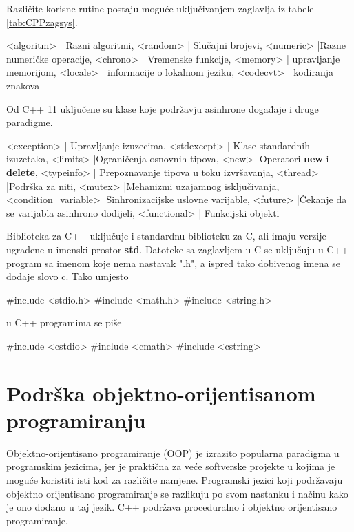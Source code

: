 \documentclass[11pt]{book}
\begin{document}
Različite korisne rutine postaju moguće uključivanjem zaglavlja iz tabele
\ref{tab:CPPzagsys}.

{
  <algoritm> | Razni algoritmi,
  <random> | Slučajni brojevi,
  <numeric> |Razne numeričke operacije,
  <chrono> | Vremenske funkcije,
  <memory> | upravljanje memorijom,
  <locale> | informacije o lokalnom jeziku,
  <codecvt> | kodiranja znakova
}

Od C++ 11 uključene su klase koje podržavju asinhrone događaje i druge paradigme.

{
  <exception> | Upravljanje izuzecima,
  <stdexcept> | Klase standardnih izuzetaka,
  <limits> |Ograničenja osnovnih tipova,
  <new> |Operatori \textbf{new} i \textbf{delete},
  <typeinfo> | Prepoznavanje tipova u toku izvršavanja,
  <thread> |Podrška za niti,
  <mutex> |Mehanizmi uzajamnog isključivanja,
  <condition\_variable> |Sinhronizacijske uslovne varijable,
  <future> |Čekanje da se varijabla asinhrono dodijeli,
  <functional> | Funkcijski objekti
}

Biblioteka za C++ uključuje i standardnu biblioteku za C, ali imaju verzije ugrađene u imenski prostor \textbf{std}. Datoteke sa zaglavljem u C se uključuju u C++ program sa imenom koje nema nastavak ".h", a ispred tako dobivenog imena se dodaje slovo c. Tako umjesto
\begin{shortlisting}
  #include <stdio.h>
  #include <math.h>
  #include <string.h>
\end{shortlisting}
u C++ programima se piše
\begin{shortlisting}
  #include <cstdio>
  #include <cmath>
  #include <cstring>
\end{shortlisting}

\section{Podrška objektno-orijentisanom programiranju}

Objektno-orijentisano programiranje (OOP) je izrazito popularna paradigma u programskim jezicima, jer je praktična za veće softverske projekte u kojima je moguće koristiti isti kod za različite namjene. Programski jezici koji podržavaju objektno orijentisano programiranje se razlikuju po svom nastanku i načinu kako je ono dodano u taj jezik. C++ podržava proceduralno i objektno orijentisano programiranje.
\end{document}
